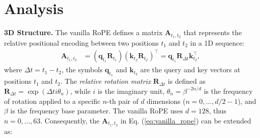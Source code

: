 \section{Analysis}

\textbf{3D Structure.}
The vanilla RoPE defines a matrix $\bm{A}_{t_1,t_2}$ that represents the relative positional encoding between two positions $t_1$ and $t_2$ in a 1D sequence:
\begin{equation}\label{eq:vanilla_rope}
\begin{aligned}
\bm{A}_{t_1,t_2}&=\left(\bm{q}_{t_1}\bm{R}_{t_1}\right){\left(\bm{k}_{t_2}\bm{R}_{t_2}\right)}^\top
= \bm{q}_{t_1}\bm{R}_{\Delta t}\bm{k}_{t_2}^\top,
\end{aligned}
\end{equation}
where $\Delta t=t_1-t_2$, the symbols $\bm{q}_{t_1}$ and $\bm{k}_{t_2}$ are the query and key vectors at positions $t_1$ and $t_2$.
The \textit{relative rotation matrix} $\bm{R}_{\Delta t}$ is defined as $\bm{R}_{\Delta t} = \exp(\Delta ti\theta_{n})$, while $i$ is the imaginary unit, $\theta_{n} = \beta^{-2n/d}$ is the frequency of rotation applied to a specific $n$-th pair of $d$ dimensions ($n=0,\ldots,d/2-1$), and $\beta$ is the frequency base parameter.
The vanilla RoPE uses $d=128$, thus $n=0,\ldots,63$.
Consequently, the $\bm{A}_{t_1,t_2}$ in Eq. (\ref{eq:vanilla_rope}) can be extended as:
